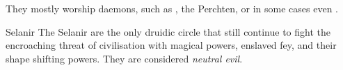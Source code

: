 They mostly worship daemons, such as , the Perchten, or
in some cases even .

\begin{35e}{Selanir}
  The Selanir are the only druidic circle that still continue to fight the
  encroaching threat of civilisation with magical powers, enslaved fey,
  and their shape shifting powers. They are considered \emph{neutral evil}.
\end{35e}
